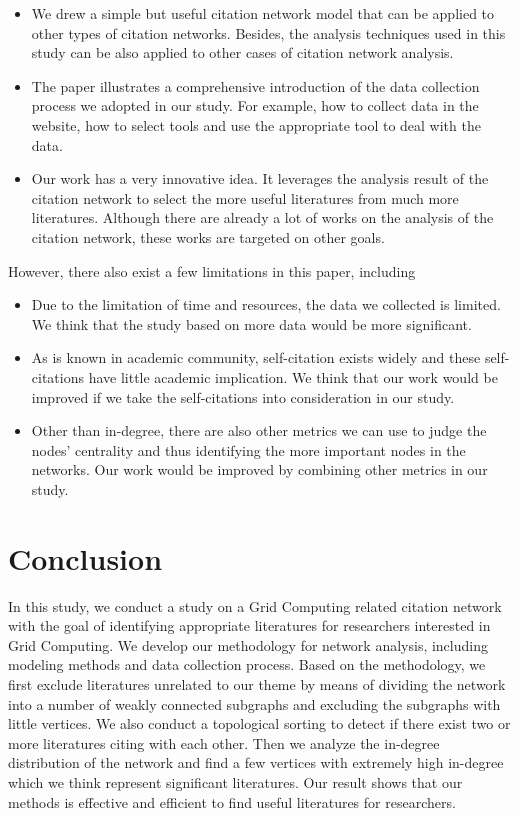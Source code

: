 \begin {itemize}
\item We drew a simple but useful citation network model that can be applied to other types of citation networks. Besides, the analysis techniques used in this study can be also applied to other cases of citation network analysis.
\item The paper illustrates a comprehensive introduction of the data collection process we adopted in our study. For example, how to collect data in the website, how to select tools and use the appropriate tool to deal with the data. 
\item Our work has a very innovative idea. It leverages the analysis result of the citation network to select the more useful literatures from much more literatures. Although there are already a lot of works on the analysis of the citation network, these works are targeted on other goals.  
\end {itemize}

However, there also exist a few limitations in this paper, including 

\begin{itemize}
\item Due to the limitation of time and resources, the data we collected is limited. We think that the study based on more data would be more significant.
\item As is known in academic community, self-citation exists widely and these self-citations have little academic implication. We think that our work would be improved if we take the self-citations into consideration in our study.
\item Other than in-degree, there are also other metrics we can use to judge the nodes' centrality and thus identifying the more important nodes in the networks. Our work would be improved by combining other metrics in our study.
\end{itemize} 


\section{Conclusion \label{S:Conclusion} }
In this study, we conduct a study on a Grid Computing related citation network with the goal of identifying appropriate literatures for researchers interested in Grid Computing. We develop our methodology for network analysis, including modeling methods and data collection process. Based on the methodology, we first exclude literatures unrelated to our theme by means of  dividing the network into a number of weakly connected subgraphs and excluding the subgraphs with little vertices. We also conduct a topological sorting to detect if there exist two or more literatures citing with each other. Then we analyze the in-degree distribution of the network and find a few vertices with extremely high in-degree which we think represent significant literatures. Our result shows that our methods is effective and efficient to find useful literatures for researchers.
